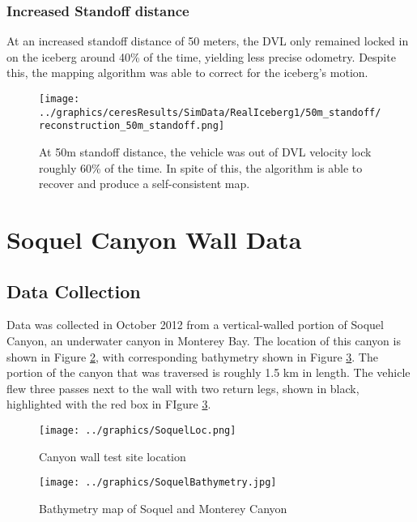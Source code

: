 \subsubsection{Increased Standoff distance}

At an increased standoff distance of 50 meters, the DVL only remained locked in on the iceberg around 40\% of the time, yielding less precise odometry. Despite this, the mapping algorithm was able to correct for the iceberg's motion.

 \begin{figure}[!htb]
   \centering
   \texttt{[image: ../graphics/ceresResults/SimData/RealIceberg1/50m\_standoff/reconstruction\_50m\_standoff.png]} %
   \caption{At 50m standoff distance, the vehicle was out of DVL velocity lock roughly 60\% of the time. In spite of this, the algorithm is able to recover and produce a self-consistent map.}
   \label{fig:FullSim50m}
\end{figure}


\clearpage
\section{Soquel Canyon Wall Data}

\subsection{Data Collection}

Data was collected in October 2012 from a vertical-walled portion of Soquel Canyon, an underwater canyon in Monterey Bay. The location of this canyon is shown in Figure \ref{fig:SoquelLoc}, with corresponding bathymetry shown in Figure \ref{fig:SoquelBathy}. The portion of the canyon that was traversed is roughly 1.5 km in length. The vehicle flew three passes next to the wall with two return legs, shown in black, highlighted with the red box in FIgure \ref{fig:SoquelBathy}.

 \begin{figure}[!htb]
   \centering
   \texttt{[image: ../graphics/SoquelLoc.png]} %
   \caption{Canyon wall test site location}
   \label{fig:SoquelLoc}
\end{figure}

 \begin{figure}[!htb]
   \centering
   \texttt{[image: ../graphics/SoquelBathymetry.jpg]} %
   \caption{Bathymetry map of Soquel and Monterey Canyon}
   \label{fig:SoquelBathy}
\end{figure}

